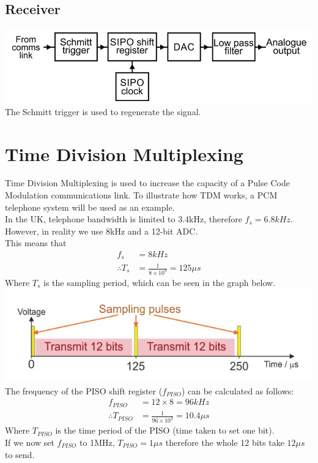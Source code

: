 \documentclass[a4paper,11pt, twocolumn]{article}
\begin{document}
\subsection{Receiver}
\includegraphics[width=\linewidth]{pcmReceiverBlockDiagram.jpg}
The Schmitt trigger is used to regenerate the signal. 

\section{Time Division Multiplexing}
Time Division Multiplexing is used to increase the capacity of a Pulse Code Modulation communications link. To illustrate how TDM works, a PCM telephone system will be used as an example.\\
In the UK, telephone bandwidth is limited to 3.4kHz, therefore $f_s = 6.8 kHz$. However, in reality we use 8kHz and a 12-bit ADC. \\
This means that
\begin{align*}
    f_s &= 8kHz\\
    \therefore T_s &= \frac{1}{8 \times 10 ^3} = 125 \mu s
\end{align*}
Where $T_s$ is the sampling period, which can be seen in the graph below.
\includegraphics[width=\linewidth]{tdm1.jpg}
The frequency of the PISO shift register ($f_{PISO}$) can be calculated as follows:
\begin{align*}
    f_{PISO} &= 12 \times 8 = 96 kHz \\
    \therefore T_{PISO} &= \frac{1}{96 \times 10^3} = 10.4 \mu s
\end{align*}
Where $T_{PISO}$ is the time period of the PISO (time taken to set one bit).\\
If we now set $f_{PISO}$ to 1MHz, $T_{PISO} = 1 \mu s$ therefore the whole 12 bits take $12 \mu s$ to send.
\end{document}
